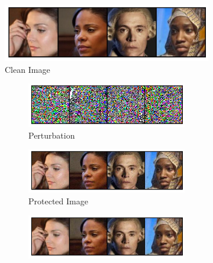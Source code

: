 \documentclass[conference]{IEEEtran}
\theoremstyle{definition}
\theoremstyle{remark}
\theoremstyle{proposition}
\begin{document}
\begin{figure}[p!]
    \begin{center}
    	\begin{subfigure}{.5\textwidth}
    		\centering
    		\includegraphics[width=1.0\textwidth, valign=c]{webface/clean.jpg}
            \caption*{Clean Image}
    	\end{subfigure}
    \end{center}
    \begin{subfigure}{1.0\textwidth}
        \begin{center}
        	\begin{subfigure}{.5\textwidth}
        		\centering
        		\includegraphics[width=1.0\textwidth, valign=c]{webface/pert_em16_samplewise.jpg}
                \caption*{Perturbation}
        	\end{subfigure}
        \end{center}
    	\begin{subfigure}{.5\textwidth}
    		\centering
    		\includegraphics[width=1.0\textwidth, valign=c]{webface/pois_em16_samplewise.jpg}
            \caption*{Protected Image}
    	\end{subfigure}
    	\begin{subfigure}{.5\textwidth}
    		\centering
    		\includegraphics[width=1.0\textwidth, valign=c]{webface/san_em16_samplewise.jpg}

\end{subfigure}
\end{subfigure}
\end{figure}
\end{document}
